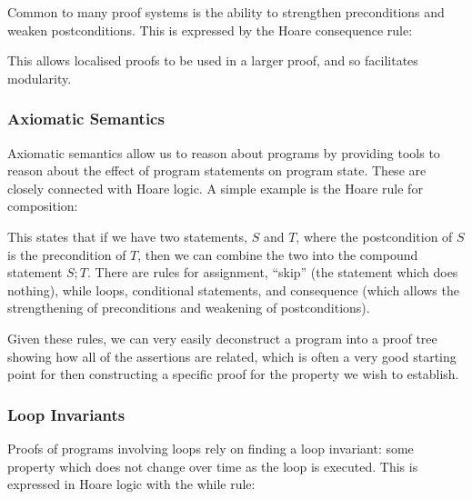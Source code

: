 Common to many proof systems is the ability to strengthen
preconditions and weaken postconditions. This is expressed by the
Hoare consequence rule:

\begin{prooftree}
\end{prooftree}

This allows localised proofs to be used in a larger proof, and so
facilitates modularity.

\subsubsection{Axiomatic Semantics}

Axiomatic semantics allow us to reason about programs by providing
tools to reason about the effect of program statements on program
state. These are closely connected with Hoare logic. A simple example
is the Hoare rule for composition:

\begin{prooftree}
\end{prooftree}

This states that if we have two statements, $S$ and $T$, where the
postcondition of $S$ is the precondition of $T$, then we can combine
the two into the compound statement $S;T$\cite{Hoare69}. There are
rules for assignment, ``skip'' (the statement which does nothing),
while loops, conditional statements, and consequence (which allows the
strengthening of preconditions and weakening of postconditions).

Given these rules, we can very easily deconstruct a program into a
proof tree showing how all of the assertions are related, which is
often a very good starting point for then constructing a specific
proof for the property we wish to establish.

\subsubsection{Loop Invariants}

Proofs of programs involving loops rely on finding a \gls{loop
  invariant}: some property which does not change over time as the
loop is executed. This is expressed in Hoare logic with the while
rule:

\begin{prooftree}
\end{prooftree}

